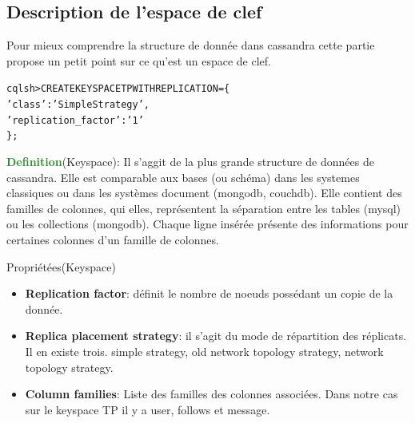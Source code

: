 \subsection{Description de l'espace de clef}
\par Pour mieux comprendre la structure de donnée dans cassandra
cette partie propose un petit point sur ce qu'est un espace de clef.

\begin{tt}
\begin{alltt}
cqlsh> CREATE KEYSPACE TP WITH REPLICATION = \{
\indent		'class' : 'SimpleStrategy',
\indent		'replication\_factor' : '1'
\};
\end{alltt}
\end{tt}

\textcolor{ForestGreen}{\textbf{Definition}}(Keyspace): Il s'aggit de la plus grande 
structure de données de cassandra. Elle est comparable aux bases (ou schéma)
dans les systemes classiques ou dans les systèmes document (mongodb, couchdb). Elle contient des familles de colonnes,  qui elles, représentent
la séparation entre les tables (mysql) ou les collections (mongodb). Chaque ligne insérée présente des informations pour certaines colonnes
d'un famille de colonnes.

\begin{block}{Propriétées(Keyspace)}
\begin{itemize}
\item \textbf{Replication factor}: définit le nombre de noeuds possédant un copie de la donnée. 
\item \textbf{Replica placement strategy}: il s'agit du mode de répartition des réplicats. Il en 
existe trois. simple strategy,  old network topology strategy, network topology strategy.
\item \textbf{Column families}: Liste des familles des colonnes associées. Dans notre cas sur le keyspace
TP il y a user, follows et message.
\end{itemize}
\end{block}

